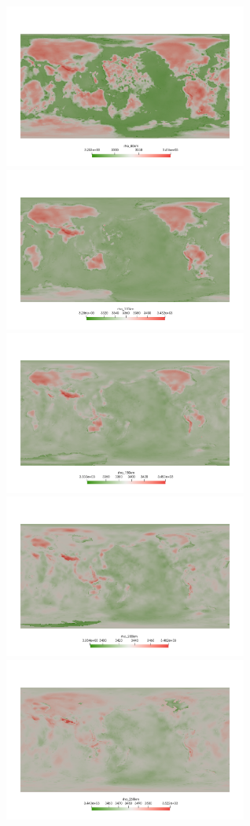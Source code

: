 \begin{center}
\includegraphics[width=8cm]{python_codes/fieldstone_99/images/rho_80}\\
\includegraphics[width=8cm]{python_codes/fieldstone_99/images/rho_110}
\includegraphics[width=8cm]{python_codes/fieldstone_99/images/rho_150}\\
\includegraphics[width=8cm]{python_codes/fieldstone_99/images/rho_200}
\includegraphics[width=8cm]{python_codes/fieldstone_99/images/rho_260}\\

\end{center}
